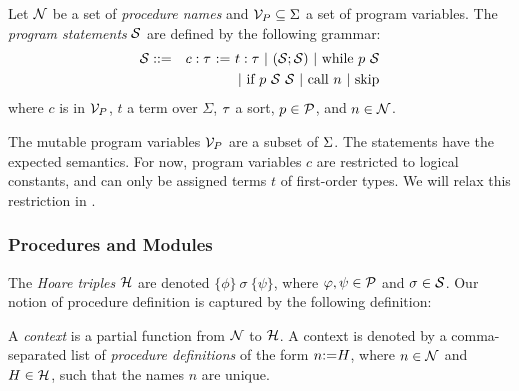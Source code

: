 \begin{definition}
  Let $\mathcal{N}$ be a set of
  \emph{procedure names} and $\mathcal{V}_{P} \subseteq \Sigma$ a set of program variables.
  The
  {\em program statements} $\mathcal{S}$ are defined by the following grammar:
\begin{eqnarray*}
  \Stat & ::= & c:\type \ \mbox{:=}\  t:\type \ |\ (\Stat;\Stat)\ |\  \mbox{while $p$ $\Stat$} \\
               &     & \ | \ \mbox{if $p$ $\Stat$ $\Stat$} \ | \  \mbox{call $n$} \ | \ \mbox{skip}
\end{eqnarray*}
where $c$ is in $\mathcal{V}_{P}$, $t$ a term over $\Sigma$, $\tau$ a sort, $p \in \mathcal{P}$, and $n \in \mathcal{N}$.
\end{definition}

\noindent The mutable program variables $\mathcal{V}_{P}$ are a subset of $\Sigma$.
The
statements have the expected semantics.
For now, program variables $c$ are restricted to logical constants, and can only be assigned
terms $t$ of first-order types.
We will relax this restriction in .


\subsubsection{Procedures and Modules}
The \emph{Hoare triples} $\mathcal{H}$ are denoted
$\{\phi\}\ \sigma\ \{\psi\}$, where $\varphi,\psi \in \mathcal{P}$ and $\sigma
\in \mathcal{S}$.  Our notion of procedure definition is captured
by the following definition:

\begin{definition}
  A \emph{context} is a partial function from $\mathcal{N}$ to $\mathcal{H}$. A context is denoted
  by a comma-separated list of \emph{procedure definitions} of the form $n \mbox{:=} H$, where
  $n\in \mathcal{N}$ and $H\in \mathcal{H}$, such that the names $n$ are unique.
\end{definition}

